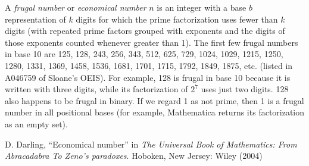 \documentclass[12pt]{article}
\begin{document}
A {\em frugal number} or {\em economical number} $n$ is an integer with a base $b$ representation of $k$ digits for which the prime factorization uses fewer than $k$ digits (with repeated prime factors grouped with exponents and the digits of those exponents counted whenever greater than 1). The first few frugal numbers in base 10 are 125, 128, 243, 256, 343, 512, 625, 729, 1024, 1029, 1215, 1250, 1280, 1331, 1369, 1458, 1536, 1681, 1701, 1715, 1792, 1849, 1875, etc. (listed in A046759 of Sloane's OEIS). For example, 128 is frugal in base 10 because it is written with three digits, while its factorization of $2^7$ uses just two digits. 128 also happens to be frugal in binary. If we regard 1 as not prime, then 1 is a frugal number in all positional bases (for example, Mathematica returns its factorization as an empty set).

\begin{thebibliography}{1}
 D. Darling, ``Economical number'' in {\it The Universal Book of Mathematics: From Abracadabra To Zeno's paradoxes}. Hoboken, New Jersey: Wiley (2004)
\end{thebibliography}
\end{document}
